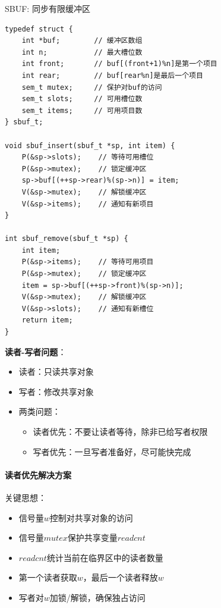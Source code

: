 SBUF: 同步有限缓冲区
\begin{lstlisting}[style=CStyle]
typedef struct {
    int *buf;        // 缓冲区数组
    int n;           // 最大槽位数
    int front;       // buf[(front+1)%n]是第一个项目
    int rear;        // buf[rear%n]是最后一个项目
    sem_t mutex;     // 保护对buf的访问
    sem_t slots;     // 可用槽位数
    sem_t items;     // 可用项目数
} sbuf_t;

void sbuf_insert(sbuf_t *sp, int item) {
    P(&sp->slots);    // 等待可用槽位
    P(&sp->mutex);    // 锁定缓冲区
    sp->buf[(++sp->rear)%(sp->n)] = item;
    V(&sp->mutex);    // 解锁缓冲区
    V(&sp->items);    // 通知有新项目
}

int sbuf_remove(sbuf_t *sp) {
    int item;
    P(&sp->items);    // 等待可用项目
    P(&sp->mutex);    // 锁定缓冲区
    item = sp->buf[(++sp->front)%(sp->n)];
    V(&sp->mutex);    // 解锁缓冲区
    V(&sp->slots);    // 通知有新槽位
    return item;
}
\end{lstlisting}

\textbf{读者-写者问题}：
\begin{itemize}
    \item 读者：只读共享对象
    \item 写者：修改共享对象
    \item 两类问题：
    \begin{itemize}
        \item 读者优先：不要让读者等待，除非已给写者权限
        \item 写者优先：一旦写者准备好，尽可能快完成
    \end{itemize}
\end{itemize}

\paragraph{读者优先解决方案}

关键思想：
\begin{itemize}
    \item 信号量$w$控制对共享对象的访问
    \item 信号量$mutex$保护共享变量$readcnt$
    \item $readcnt$统计当前在临界区中的读者数量
    \item 第一个读者获取$w$，最后一个读者释放$w$
    \item 写者对$w$加锁/解锁，确保独占访问
\end{itemize}

